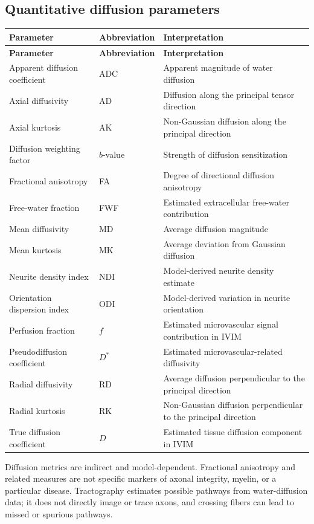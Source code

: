 \subsection{Quantitative diffusion parameters}
\begin{longtable}{@{}p{}p{}p{}@{}}
\toprule
\textbf{Parameter} & \textbf{Abbreviation} & \textbf{Interpretation} \\
\midrule
\endfirsthead
\toprule
\textbf{Parameter} & \textbf{Abbreviation} & \textbf{Interpretation} \\
\midrule
\endhead
Apparent diffusion coefficient & ADC & Apparent magnitude of water diffusion \\
Axial diffusivity & AD & Diffusion along the principal tensor direction \\
Axial kurtosis & AK & Non-Gaussian diffusion along the principal direction \\
Diffusion weighting factor & $b$-value & Strength of diffusion sensitization \\
Fractional anisotropy & FA & Degree of directional diffusion anisotropy \\
Free-water fraction & FWF & Estimated extracellular free-water contribution \\
Mean diffusivity & MD & Average diffusion magnitude \\
Mean kurtosis & MK & Average deviation from Gaussian diffusion \\
Neurite density index & NDI & Model-derived neurite density estimate \\
Orientation dispersion index & ODI & Model-derived variation in neurite orientation \\
Perfusion fraction & $f$ & Estimated microvascular signal contribution in IVIM \\
Pseudodiffusion coefficient & $D^*$ & Estimated microvascular-related diffusivity \\
Radial diffusivity & RD & Average diffusion perpendicular to the principal direction \\
Radial kurtosis & RK & Non-Gaussian diffusion perpendicular to the principal direction \\
True diffusion coefficient & $D$ & Estimated tissue diffusion component in IVIM \\
\bottomrule
\end{longtable}

Diffusion metrics are indirect and model-dependent. Fractional anisotropy and related measures are not specific markers of axonal integrity, myelin, or a particular disease. Tractography estimates possible pathways from water-diffusion data; it does not directly image or trace axons, and crossing fibers can lead to missed or spurious pathways.

